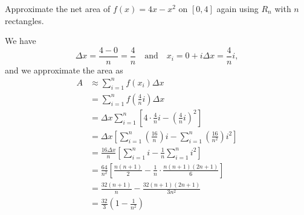 \begin{example} %
Approximate the net area of $f(x)=4x-x^2$ on $[0,4]$ again using $R_n$ with $n$ rectangles. 

\solution We have 
\[ \Delta x = \frac{4-0}{n} = \frac{4}{n} \quad \mbox{and} \quad x_i = 0 + i \Delta x = \frac{4}{n}i,\]
and we approximate the area as
\begin{align*}
A &\approx \sum_{i=1}^n f(x_i) \Delta x \\
&= \sum_{i=1}^n f \left( \frac{4}{n}i \right) \Delta x \\
&= \Delta x \sum_{i=1}^n \left[ 4 \cdot \frac{4}{n}i - \left( \frac{4}{n}i \right)^2 \right]  \\
&= \Delta x \left[ \sum_{i=1}^n \left(\frac{16}{n}\right)i - \sum_{i=1}^n \left(\frac{16}{n^2}\right)i^2 \right] \\
&= \frac{16\Delta x}{n} \left[ \sum_{i=1}^n i - \frac{1}{n} \sum_{i=1}^n i^2 \right]  \\
&= \frac{64}{n^2} \left[ \frac{n(n+1)}{2} - \frac{1}{n} \cdot \frac{n(n+1)(2n+1)}{6} \right] \\
&= \frac{32(n+1)}{n} - \frac{32(n+1)(2n+1)}{3n^2} \\
&= \frac{32}{3}\left(1-\frac{1}{n^2}\right)
\end{align*}
\end{example}